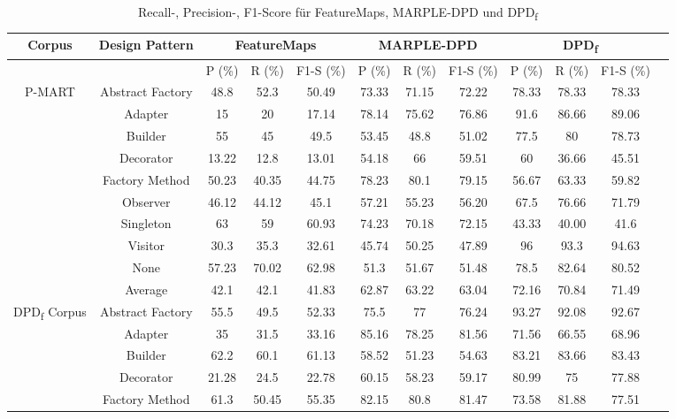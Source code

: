 \documentclass[conference]{IEEEtran}
\begin{document}
\begin{table}
    \caption{Recall-, Precision-, F1-Score für FeatureMaps, MARPLE-DPD und DPD\textsubscript{f}}
    \label{table:8}
    \begin{tabular}{|c|c|c|c|c|c|c|c|c|c|c|c|}
        \hline
        Corpus & Design Pattern & \multicolumn{3}{|c|}{FeatureMaps} & \multicolumn{3}{|c|}{MARPLE-DPD} & \multicolumn{3}{|c|}{DPD\textsubscript{f}}\\
        \hline
        & & P (\%) & R (\%) & F1-S (\%) & P (\%) & R (\%) & F1-S (\%) & P (\%) & R (\%) & F1-S (\%)\\
        \hline
        \multirow{9}{*}{P-MART} & Abstract Factory & 48.8 & 52.3 & 50.49 & 73.33 & 71.15 & 72.22 & 78.33 & 78.33 & 78.33\\
        & Adapter & 15 & 20 & 17.14 & 78.14 & 75.62 & 76.86 & 91.6 & 86.66 & 89.06\\
        & Builder & 55 & 45 & 49.5 & 53.45 & 48.8 & 51.02 & 77.5 & 80 & 78.73\\
        & Decorator & 13.22 & 12.8 & 13.01 & 54.18 & 66 & 59.51 & 60 & 36.66 & 45.51\\
        & Factory Method & 50.23 & 40.35 & 44.75 & 78.23 & 80.1 & 79.15 & 56.67 & 63.33 & 59.82\\
        & Observer & 46.12 & 44.12 & 45.1 & 57.21 & 55.23 & 56.20 & 67.5 & 76.66 & 71.79\\
        & Singleton & 63 & 59 & 60.93 & 74.23 & 70.18 & 72.15 & 43.33 & 40.00 & 41.6\\
        & Visitor & 30.3 & 35.3 & 32.61 & 45.74 & 50.25 & 47.89 & 96 & 93.3 & 94.63\\
        & None & 57.23 & 70.02 & 62.98 & 51.3 & 51.67 & 51.48 & 78.5 & 82.64 & 80.52\\
        \cline{2-11}
        & Average & 42.1 & 42.1 & 41.83 & 62.87 & 63.22 & 63.04 & 72.16 & 70.84 & 71.49\\
        \hline
        \multirow{9}{*}{DPD\textsubscript{f} Corpus} & Abstract Factory & 55.5 & 49.5 & 52.33 & 75.5 & 77 & 76.24 & 93.27 & 92.08 & 92.67\\
        & Adapter & 35 & 31.5 & 33.16 & 85.16 & 78.25 & 81.56 & 71.56 & 66.55 & 68.96\\
        & Builder & 62.2 & 60.1 & 61.13 & 58.52 & 51.23 & 54.63 & 83.21 & 83.66 & 83.43\\
        & Decorator & 21.28 & 24.5 & 22.78 & 60.15 & 58.23 & 59.17 & 80.99 & 75 & 77.88\\
        & Factory Method & 61.3 & 50.45 & 55.35 & 82.15 & 80.8 & 81.47 & 73.58 & 81.88 & 77.51\\

\end{tabular}
\end{table}
\end{document}
